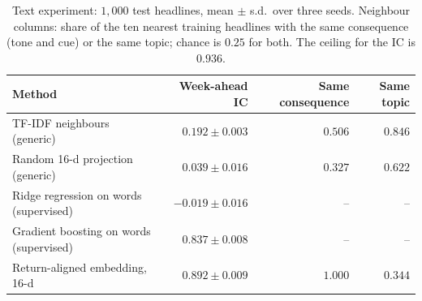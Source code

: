 \documentclass{article}
\theoremstyle{plain}
\theoremstyle{definition}
\theoremstyle{remark}
\begin{document}
\begin{table}[ht]
\centering
\caption{Text experiment: $1{,}000$ test headlines, mean $\pm$ s.d.\ over three seeds. Neighbour columns: share of the ten nearest training headlines with the same consequence (tone and cue) or the same topic; chance is $0.25$ for both. The ceiling for the IC is $0.936$.}
\label{tab:text}
\small
\begin{tabular}{@{}lrrr@{}}
\toprule
Method & Week-ahead IC & Same consequence & Same topic \\
\midrule
TF-IDF neighbours (generic) & $0.192\pm0.003$ & $0.506$ & $0.846$ \\
Random 16-d projection (generic) & $0.039\pm0.016$ & $0.327$ & $0.622$ \\
Ridge regression on words (supervised) & $-0.019\pm0.016$ & -- & -- \\
Gradient boosting on words (supervised) & $0.837\pm0.008$ & -- & -- \\
Return-aligned embedding, 16-d & $\mathbf{0.892\pm0.009}$ & $\mathbf{1.000}$ & $0.344$ \\
\bottomrule
\end{tabular}
\end{table}
\end{document}
